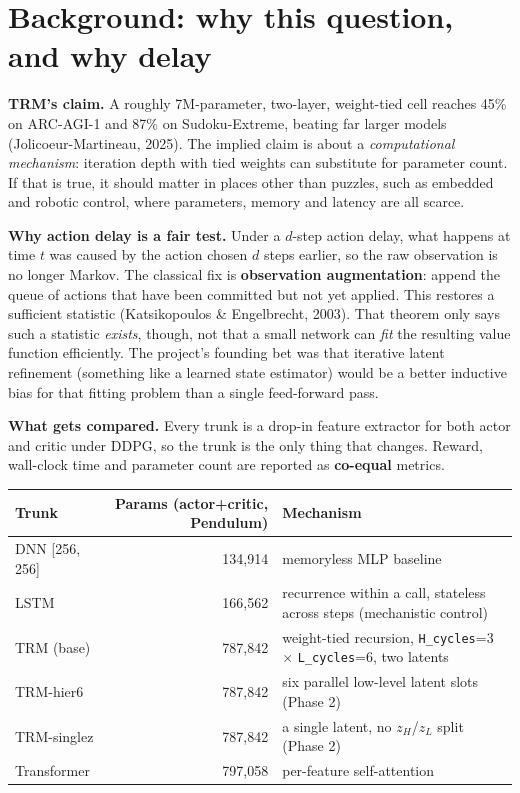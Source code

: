 \documentclass[11pt]{article}
\begin{document}
\section{Background: why this question, and why delay}

\textbf{TRM's claim.} A roughly 7M-parameter, two-layer, weight-tied cell reaches 45\% on ARC-AGI-1 and 87\% on Sudoku-Extreme, beating far larger models (Jolicoeur-Martineau, 2025). The implied claim is about a \emph{computational mechanism}: iteration depth with tied weights can substitute for parameter count. If that is true, it should matter in places other than puzzles, such as embedded and robotic control, where parameters, memory and latency are all scarce.

\textbf{Why action delay is a fair test.} Under a $d$-step action delay, what happens at time $t$ was caused by the action chosen $d$ steps earlier, so the raw observation is no longer Markov. The classical fix is \textbf{observation augmentation}: append the queue of actions that have been committed but not yet applied. This restores a sufficient statistic (Katsikopoulos \& Engelbrecht, 2003). That theorem only says such a statistic \emph{exists}, though, not that a small network can \emph{fit} the resulting value function efficiently. The project's founding bet was that iterative latent refinement (something like a learned state estimator) would be a better inductive bias for that fitting problem than a single feed-forward pass.

\textbf{What gets compared.} Every trunk is a drop-in feature extractor for both actor and critic under DDPG, so the trunk is the only thing that changes. Reward, wall-clock time and parameter count are reported as \textbf{co-equal} metrics.

\begin{table}[H]
\centering\small
\begin{tabularx}{\textwidth}{lrY}
\toprule
Trunk & Params (actor+critic, Pendulum) & Mechanism \\
\midrule
DNN [256, 256] & 134,914 & memoryless MLP baseline \\
LSTM & 166,562 & recurrence within a call, stateless across steps (mechanistic control) \\
TRM (base) & 787,842 & weight-tied recursion, \texttt{H\_cycles}=3 $\times$ \texttt{L\_cycles}=6, two latents \\
TRM-hier6 & 787,842 & six parallel low-level latent slots (Phase 2) \\
TRM-singlez & 787,842 & a single latent, no $z_H$/$z_L$ split (Phase 2) \\
Transformer & 797,058 & per-feature self-attention \\
\bottomrule
\end{tabularx}
\end{table}
\end{document}
